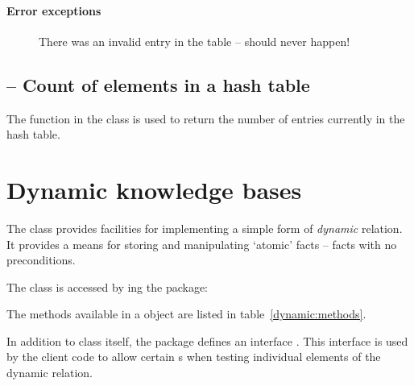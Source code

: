 \paragraph{Error exceptions}
\begin{description}
\item[]
There was an invalid entry in the table -- should never happen!
\end{description}

\subsection{ -- Count of elements in a hash table}
\label{hash:count}

The  function in the  class is used to return the number of entries currently in the hash table.

\section{Dynamic knowledge bases}
\label{dynamic:knowledge}

The  class provides facilities for implementing a simple form of \emph{dynamic} relation. It provides a means for storing and manipulating `atomic' facts -- facts with no preconditions.

The  class is accessed by ing the  package:

The methods available in a  object are listed in table~\vref{dynamic:methods}.

In addition to  class itself, the  package defines an interface . This interface is used by the client code to allow certain s when testing individual elements of the dynamic relation.

